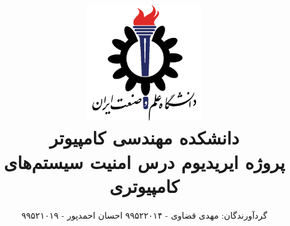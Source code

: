 \title{
    \center
    \includegraphics[width=5cm, height=5cm]{images/IUST_logo_color.png} \\
    دانشکده مهندسی کامپیوتر \\[25pt]     
پروژه ایریدیوم درس امنیت سیستم‌های کامپیوتری\\
\CourseName
}

\author{
    گردآورندگان:
    مهدی قضاوی - ۹۹۵۲۲۰۱۴
    احسان احمدپور - ۹۹۵۲۱۰۱۹
}
\date{\Semester}